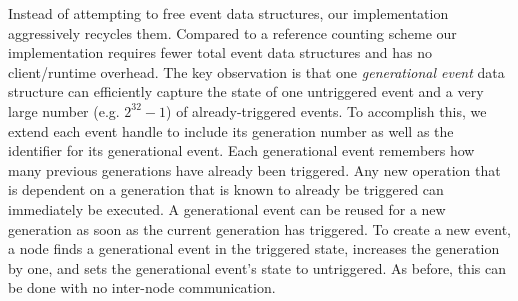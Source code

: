Instead of attempting to free event data structures, our implementation aggressively recycles them.
Compared to a reference counting scheme our implementation requires fewer total event data structures
and has no client/runtime overhead.  The key observation is that one {\em generational event}
data structure can efficiently capture the state of one untriggered event and a very large 
number (e.g. $2^{32}-1$) of already-triggered events.  To accomplish this, we extend each event
handle to include its generation number as well as the identifier for its generational event.  Each
generational event remembers how many previous generations have already been triggered.  Any
new operation that is dependent on a generation that is known to already be triggered can immediately
be executed.  A generational event can be reused for a new generation as soon as the current generation has triggered. To
create a new event, a node finds a generational event in the triggered state,
increases the generation by one, and sets the generational event's state to untriggered.  As before, 
this can be done with no inter-node communication.

